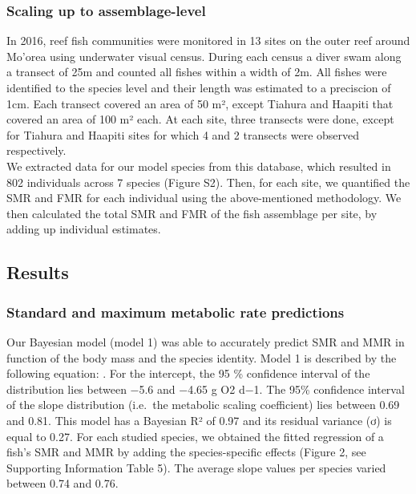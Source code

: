 \documentclass[12pt,a4paper]{article}
\begin{document}
\hypertarget{scaling-up-to-assemblage-level}{%
\subsubsection{Scaling up to
assemblage-level}\label{scaling-up-to-assemblage-level}}

\noindent In 2016, reef fish communities were monitored in 13 sites on
the outer reef around Mo'orea using underwater visual census. During
each census a diver swam along a transect of 25m and counted all fishes
within a width of 2m. All fishes were identified to the species level
and their length was estimated to a preciscion of 1cm. Each transect
covered an area of 50 m², except Tiahura and Haapiti that covered an
area of 100 m² each. At each site, three transects were done, except for
Tiahura and Haapiti sites for which 4 and 2 transects were observed
respectively.\\
We extracted data for our model species from this database, which
resulted in 802 individuals across 7 species (Figure S2). Then, for each
site, we quantified the SMR and FMR for each individual using the
above-mentioned methodology. We then calculated the total SMR and FMR of
the fish assemblage per site, by adding up individual estimates.

\hypertarget{results}{%
\subsection{Results}\label{results}}

\hypertarget{standard-and-maximum-metabolic-rate-predictions}{%
\subsubsection{Standard and maximum metabolic rate
predictions}\label{standard-and-maximum-metabolic-rate-predictions}}

\noindent Our Bayesian model (model 1) was able to accurately predict
SMR and MMR in function of the body mass and the species identity. Model
1 is described by the following equation: . For the intercept, the 95 \%
confidence interval of the distribution lies between −5.6 and −4.65 g O2
d−1. The 95\% confidence interval of the slope distribution (i.e.~the
metabolic scaling coefficient) lies between 0.69 and 0.81. This model
has a Bayesian R² of 0.97 and its residual variance (ơ) is equal to
0.27. For each studied species, we obtained the fitted regression of a
fish's SMR and MMR by adding the species-specific effects (Figure 2, see
Supporting Information Table 5). The average slope values per species
varied between 0.74 and 0.76.
\end{document}
